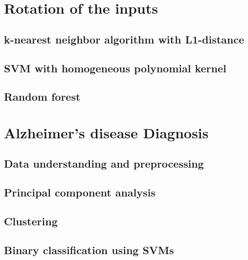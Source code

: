 \documentclass[a4paper,12pt]{article}
\begin{document}
\section{Rotation of the inputs}

\subsection{k-nearest neighbor algorithm with L1-distance}

\subsection{SVM with homogeneous polynomial kernel}

\subsection{Random forest}

\section{Alzheimer's disease Diagnosis}

\subsection{Data understanding and preprocessing}

\subsection{Principal component analysis}

\subsection{Clustering}

\subsection{Binary classification using SVMs}
\end{document}
